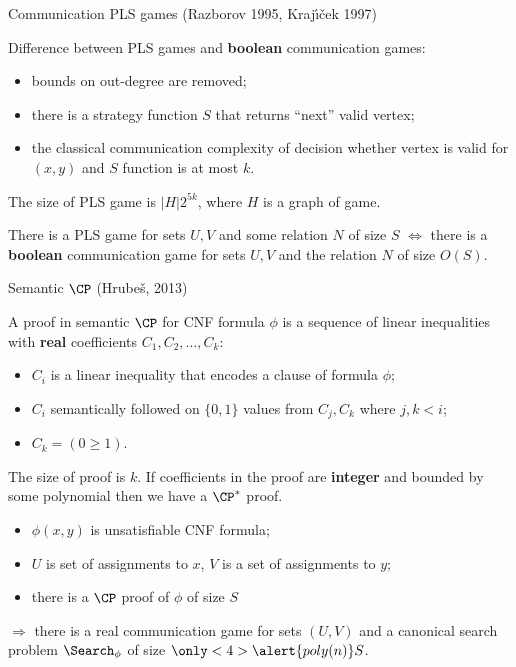 \begin{frame}{Communication PLS games (Razborov 1995, Kraj{\'{\i}}{\v{c}}ek 1997)}

    Difference between PLS games and \textbf{boolean} communication games:
    \begin{itemize}
        \item bounds on out-degree are removed;
        \item there is a strategy function $S$ that returns ``next'' valid vertex;
        \item the classical communication complexity of decision whether vertex is valid for $(x, y)$ and
            $S$ function is at most $k$.
    \end{itemize}

    The size of PLS game is $|H| 2^{5 k}$, where $H$ is a graph of game.

    \pause

    \begin{theorem}[S 2016]
        There is a PLS game for sets $U, V$ and some relation $N$ of size $S$ $\Leftrightarrow$ there is
        a \textbf{boolean} communication game for sets $U, V$ and the relation $N$ of size $O(S)$.
    \end{theorem}

\end{frame}


\begin{frame}{Semantic $\CP$ (Hrube{\v{s}}, 2013)}

    A proof in semantic $\CP$ for CNF formula $\phi$ is a sequence of linear inequalities with \textbf{real} coefficients
    $C_1, C_2, \dots, C_k$:
    \begin{itemize}
        \item $C_i$ is a linear inequality that encodes a clause of formula $\phi$;
        \item $C_i$ semantically followed on $\{0, 1\}$ values from $C_j, C_k$ where $j, k < i$;
        \item $C_k = (0 \ge 1)$.
    \end{itemize}

    \pause
    The size of proof is $k$. If coefficients in the proof are \textbf{integer} and bounded by some polynomial then we have a
    $\CP^*$ proof.

    \pause

    \begin{lemma}
        \begin{itemize}
            \item $\phi(x, y)$ is unsatisfiable CNF formula;
            \item $U$ is set of assignments to $x$, $V$ is a set of assignments to $y$;
            \item there is a $\CP$  proof of $\phi$ of size $S$
        \end{itemize}
        $\Rightarrow$ there is a real  communication game for sets $(U, V)$ and a canonical search
        problem $\Search_{\phi}$ of size $\only<4>{\alert{poly(n)}} S$.
    \end{lemma}

\end{frame}

